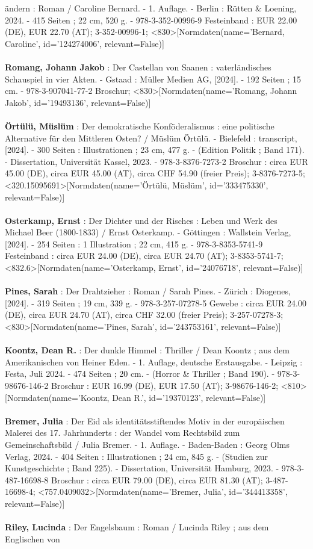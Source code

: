 \documentclass{article}
\begin{document}
\begin{multicols}{3}
ändern : Roman / Caroline Bernard. - 1. Auflage. - Berlin : Rütten \& Loening, 2024. - 415 Seiten ; 22 cm, 520 g. - 978-3-352-00996-9 Festeinband : EUR 22.00 (DE), EUR 22.70 (AT); 3-352-00996-1; <830>[Normdaten(name='Bernard, Caroline', id='124274006', relevant=False)]\\\\\textbf{Romang, Johann Jakob} : Der Castellan von Saanen : vaterländisches Schauspiel in vier Akten. - Gstaad : Müller Medien AG, [2024]. - 192 Seiten ; 15 cm. - 978-3-907041-77-2 Broschur; <830>[Normdaten(name='Romang, Johann Jakob', id='19493136', relevant=False)]\\\\\textbf{Örtülü, Müslüm} : Der demokratische Konföderalismus : eine politische Alternative für den Mittleren Osten? / Müslüm Örtülü. - Bielefeld : transcript, [2024]. - 300 Seiten : Illustrationen ; 23 cm, 477 g. - (Edition Politik ; Band 171). - Dissertation, Universität Kassel, 2023. - 978-3-8376-7273-2 Broschur : circa EUR 45.00 (DE), circa EUR 45.00 (AT), circa CHF 54.90 (freier Preis); 3-8376-7273-5; <320.15095691>[Normdaten(name='Örtülü, Müslüm', id='333475330', relevant=False)]\\\\\textbf{Osterkamp, Ernst} : Der Dichter und der Risches : Leben und Werk des Michael Beer (1800-1833) / Ernst Osterkamp. - Göttingen : Wallstein Verlag, [2024]. - 254 Seiten : 1 Illustration ; 22 cm, 415 g. - 978-3-8353-5741-9 Festeinband : circa EUR 24.00 (DE), circa EUR 24.70 (AT); 3-8353-5741-7; <832.6>[Normdaten(name='Osterkamp, Ernst', id='24076718', relevant=False)]\\\\\textbf{Pines, Sarah} : Der Drahtzieher : Roman / Sarah Pines. - Zürich : Diogenes, [2024]. - 319 Seiten ; 19 cm, 339 g. - 978-3-257-07278-5 Gewebe : circa EUR 24.00 (DE), circa EUR 24.70 (AT), circa CHF 32.00 (freier Preis); 3-257-07278-3; <830>[Normdaten(name='Pines, Sarah', id='243753161', relevant=False)]\\\\\textbf{Koontz, Dean R.} : Der dunkle Himmel : Thriller / Dean Koontz ; aus dem Amerikanischen von Heiner Eden. - 1. Auflage, deutsche Erstausgabe. - Leipzig : Festa, Juli 2024. - 474 Seiten ; 20 cm. - (Horror \& Thriller ; Band 190). - 978-3-98676-146-2 Broschur : EUR 16.99 (DE), EUR 17.50 (AT); 3-98676-146-2; <810>[Normdaten(name='Koontz, Dean R.', id='19370123', relevant=False)]\\\\\textbf{Bremer, Julia} : Der Eid als identitätsstiftendes Motiv in der europäischen Malerei des 17. Jahrhunderts : der Wandel vom Rechtsbild zum Gemeinschaftsbild / Julia Bremer. - 1. Auflage. - Baden-Baden : Georg Olms Verlag, 2024. - 404 Seiten : Illustrationen ; 24 cm, 845 g. - (Studien zur Kunstgeschichte ; Band 225). - Dissertation, Universität Hamburg, 2023. - 978-3-487-16698-8 Broschur : circa EUR 79.00 (DE), circa EUR 81.30 (AT); 3-487-16698-4; <757.0409032>[Normdaten(name='Bremer, Julia', id='344413358', relevant=False)]\\\\\textbf{Riley, Lucinda} : Der Engelsbaum : Roman / Lucinda Riley ; aus dem Englischen von 
\end{multicols}
\end{document}
